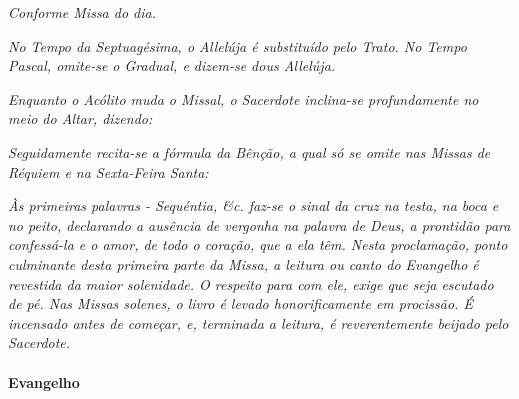 \emph{Conforme Missa do dia.}

\textit{No Tempo da Septuagésima, o Allelúja é substituído pelo Trato. No Tempo Pascal, omite-se o Gradual, e dizem-se dous Allelúja.}

\textit{Enquanto o Acólito muda o Missal, o Sacerdote inclina-se profundamente no meio do Altar, dizendo:}

\begin{paracol}{2}\switchcolumn{}\end{paracol}

\textit{Seguidamente recita-se a fórmula da Bênção, a qual só se omite nas Missas de Réquiem e na Sexta-Feira Santa:}

\begin{paracol}{2}\switchcolumn{}\end{paracol}

\textit{Às primeiras palavras - Sequéntia, \&c. faz-se o sinal da cruz na testa, na boca e no peito, declarando a ausência de vergonha na palavra de Deus, a prontidão para confessá-la e o amor, de todo o coração, que a ela têm. Nesta proclamação, ponto culminante desta primeira parte da Missa, a leitura ou canto do Evangelho é revestida da maior solenidade. O respeito para com ele, exige que seja escutado de pé. Nas Missas solenes, o livro é levado honorificamente em procissão. É incensado antes de começar, e, terminada a leitura, é reverentemente beijado pelo Sacerdote.}

\paragraph{Evangelho}


